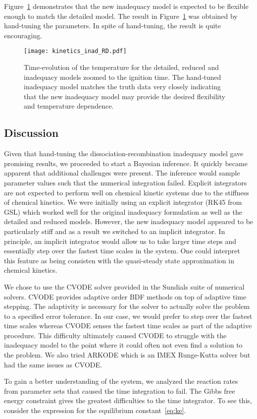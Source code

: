 \documentclass[fontsize=12pt, %
               paper=a4, %
               hyperref]{report}
\begin{document}
  Figure~\ref{fig:new_inad_demo} demonstrates that the new inadequacy 
  model is expected to be flexible enough to match the detailed model.  
  The result in Figure~\ref{fig:new_inad_demo} was obtained by 
  hand-tuning the parameters.  In spite of hand-tuning, the result 
  is quite encouraging.
  \begin{figure}[h!]
    \centering
    \texttt{[image: kinetics\_inad\_RD.pdf]}
    \caption{Time-evolution of the temperature for the detailed, reduced 
             and inadequacy models zoomed to the ignition time.  The 
             hand-tuned inadequacy model matches the truth data very 
             closely indicating that the new inadequacy model may 
             provide the desired flexibility and temperature dependence.}
    \label{fig:new_inad_demo}
  \end{figure}

  \subsection{Discussion}
  Given that hand-tuning the dissociation-recombination 
  inadequacy model gave promising results, we proceeded 
  to start a Bayesian inference.  It quickly became 
  apparent that additional challenges were present.  The 
  inference would sample parameter values such that the 
  numerical integration failed.  Explicit integrators 
  are not expected to perform well on chemical kinetic 
  systems due to the stiffness of chemical kinetics.  We 
  were initially using an explicit integrator (RK45 from GSL) 
  which worked  well for the original inadequacy formulation 
  as well as the detailed and reduced models.  However, 
  the new inadequacy model appeared to be particularly stiff 
  and as a result we switched to an implicit integrator.  
  In principle, an implicit integrator would allow us to 
  take larger time steps and essentially step over the 
  fastest time scales in the system.  One could interpret 
  this feature as being consisten with the quasi-steady state 
  approximation in chemical kinetics.

  We chose to use the CVODE solver provided in the Sundials 
  suite of numerical solvers.  CVODE provides adaptive order 
  BDF methods on top of adaptive time stepping.  The adaptivity 
  is necessary for the solver to actually solve the problem 
  to a specified error tolerance.  In our case, we 
  would prefer to step over the fastest time scales whereas 
  CVODE senses the fastest time scales as part of the 
  adaptive procedure.  This difficulty ultimately caused 
  CVODE to struggle with the inadequacy model to the point 
  where it could often not even find a solution to the problem. 
  We also tried ARKODE which is an IMEX Runge-Kutta solver but 
  had the same issues as CVODE.

  To gain a better understanding of the system, we analyzed 
  the reaction rates from parameter sets that caused the 
  time integration to fail.  The Gibbs free energy constraint 
  gives the greatest difficulties to the time integrator.  To 
  see this, consider the expression for the equilibrium 
  constant~\eqref{eq:ke}.



\end{document}
